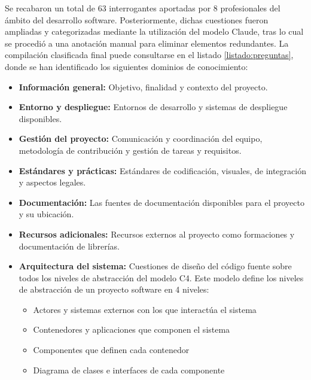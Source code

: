 Se recabaron un total de 63 interrogantes aportadas por 8 profesionales del ámbito del desarrollo software. Posteriormente, dichas cuestiones fueron ampliadas y categorizadas mediante la utilización del modelo Claude, tras lo cual se procedió a una anotación manual para eliminar elementos redundantes. La compilación clasificada final puede consultarse en el listado \ref{listado:preguntas}, donde se han identificado los siguientes dominios de conocimiento:

\begin{itemize}
\item\textbf{Información general: }Objetivo, finalidad y contexto del proyecto.
\item\textbf{Entorno y despliegue: }Entornos de desarrollo y sistemas de despliegue disponibles.
\item\textbf{Gestión del proyecto: }Comunicación y coordinación del equipo, metodología de contribución y gestión de tareas y requisitos.
\item\textbf{Estándares y prácticas: }Estándares de codificación, visuales, de integración y aspectos legales.
\item\textbf{Documentación: }Las fuentes de documentación disponibles para el proyecto y su ubicación.
\item\textbf{Recursos adicionales: }Recursos externos al proyecto como formaciones y documentación de librerías.
\item\textbf{Arquitectura del sistema: }Cuestiones de diseño del código fuente sobre todos los niveles de abstracción del modelo C4\cite{noauthor_c4_nodate}. Este modelo define los niveles de abstracción de un proyecto software en 4 niveles:
\begin{itemize}
\item Actores y sistemas externos con los que interactúa el sistema
\item Contenedores y aplicaciones que componen el sistema
\item Componentes que definen cada contenedor
\item Diagrama de clases e interfaces de cada componente
\end{itemize}
\end{itemize}

